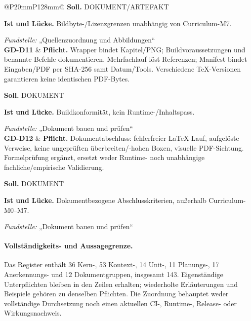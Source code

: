\begin{longtable}{@{}P{20mm}P{128mm}@{}}
\textbf{Soll.} DOKUMENT/ARTEFAKT\par\smallskip
\textbf{Ist und Lücke.} Bildbyte-/Lizenzgrenzen unabhängig von Curriculum-M7.\par\smallskip
\emph{Fundstelle:} „Quellenzuordnung und Abbildungen“\\\addlinespace[5pt]
\label{rule:GD-D11}\textbf{GD-D11} &
\textbf{Pflicht.} Wrapper bindet Kapitel/PNG; Buildvoraussetzungen und benannte Befehle dokumentieren. Mehrfachlauf löst Referenzen; Manifest bindet Eingaben/PDF per SHA-256 samt Datum/Tools. Verschiedene TeX-Versionen garantieren keine identischen PDF-Bytes.\par\smallskip
\textbf{Soll.} DOKUMENT\par\smallskip
\textbf{Ist und Lücke.} Buildkonformität, kein Runtime-/Inhaltspass.\par\smallskip
\emph{Fundstelle:} „Dokument bauen und prüfen“\\\addlinespace[5pt]
\label{rule:GD-D12}\textbf{GD-D12} &
\textbf{Pflicht.} Dokumentabschluss: fehlerfreier LaTeX-Lauf, aufgelöste Verweise, keine ungeprüften überbreiten/-hohen Boxen, visuelle PDF-Sichtung. Formelprüfung ergänzt, ersetzt weder Runtime- noch unabhängige fachliche/empirische Validierung.\par\smallskip
\textbf{Soll.} DOKUMENT\par\smallskip
\textbf{Ist und Lücke.} Dokumentbezogene Abschlusskriterien, außerhalb Curriculum-M0–M7.\par\smallskip
\emph{Fundstelle:} „Dokument bauen und prüfen“\\\addlinespace[5pt]
\bottomrule
\end{longtable}
\endgroup

\paragraph{Vollständigkeits- und Aussagegrenze.}
Das Register enthält 36 Kern-, 53 Kontext-, 14 Unit-, 11 Planungs-, 17 Anerkennungs- und 12 Dokumentgruppen, insgesamt 143. Eigenständige Unterpflichten bleiben in den Zeilen erhalten; wiederholte Erläuterungen und Beispiele gehören zu denselben Pflichten. Die Zuordnung behauptet weder vollständige Durchsetzung noch einen aktuellen CI-, Runtime-, Release- oder Wirkungsnachweis.
